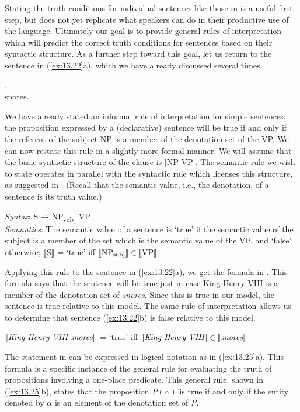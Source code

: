 Stating the truth conditions for individual sentences like those in  is a useful first step, but does not yet replicate what speakers can do in their productive use of the language. Ultimately our goal is to provide general rules of interpretation which will predict the correct truth conditions for sentences based on their syntactic structure. As a further step toward this goal, let us return to the sentence in (\ref{ex:13.22}a), which we have already discussed several times.


\ea \label{ex:13.22}
.\\
  {snores}.
                       \z
\z


We have already stated an informal rule of interpretation for simple sentences: the proposition expressed by a (declarative) sentence will be true if and only if the referent of the subject NP is a member of the denotation set of the VP. We can now restate this rule in a slightly more formal manner. We will assume that the basic syntactic structure of the clause is [NP VP]. The semantic rule we wish to state operates in parallel with the syntactic rule which licenses this structure, as suggested in . (Recall that the semantic value, i.e., the denotation, of a sentence is its truth value.)


\ea \label{ex:13.23}
\textit{Syntax}: S  →  NP\textsubscript{subj}  VP\\
\textit{Semantics}: The semantic value of a sentence is ‘true’ if the semantic value of the subject is a member of the set which is the semantic value of the VP, and ‘false’ otherwise; {}$\llbracket\text{S}\rrbracket$  = ‘true’  iff  $\llbracket\text{NP\textsubscript{subj}}\rrbracket \in \llbracket\text{VP}\rrbracket$ 
\z


Applying this rule to the sentence in (\ref{ex:13.22}a), we get the formula in . This formula says that the sentence will be true just in case King Henry VIII is a member of the denotation set of \textit{snores}. Since this is true in our model, the sentence is true relative to this model. The same rule of interpretation allows us to determine that sentence (\ref{ex:13.22}b) is false relative to this model.


\ea \label{ex:13.24}
{}$\llbracket\text{\itshape King Henry VIII snores}\rrbracket$  = ‘true’  iff  $\llbracket\text{\itshape King Henry VIII}\rrbracket \in \llbracket\text{\itshape  snores}\rrbracket$ 
\z


The statement in  can be expressed in logical notation as in (\ref{ex:13.25}a). This formula is a specific instance of the general rule for evaluating the truth of propositions involving a one-place predicate. This general rule, shown in (\ref{ex:13.25}b), states that the proposition $P(\alpha)$ is true if and only if the entity denoted by $\alpha$ is an element of the denotation set of \textit{P}.


